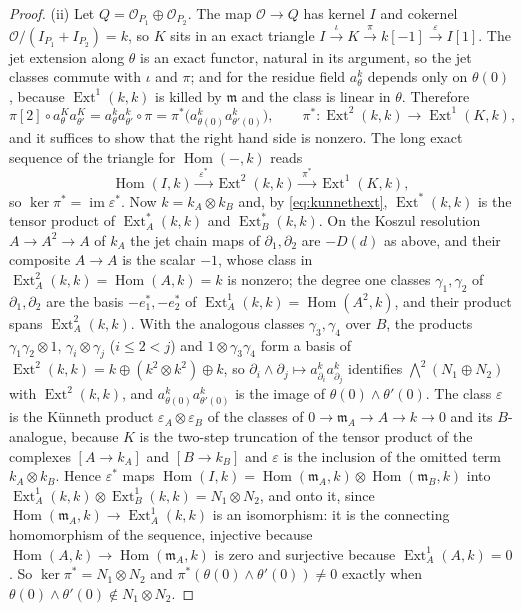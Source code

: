 \documentclass[11pt,reqno]{amsart}
\theoremstyle{plain}
\theoremstyle{definition}
\theoremstyle{remark}
\newcommand{\cO}{\mathcal{O}}
\DeclareMathOperator{\Hom}{Hom}
\DeclareMathOperator{\Ext}{Ext}
\DeclareMathOperator{\image}{im}
\begin{document}
\begin{proof}
(ii) Let $Q=\cO_{P_{1}}\oplus\cO_{P_{2}}$. The map $\cO\to Q$ has kernel $I$
and cokernel $\cO/(I_{P_{1}}+I_{P_{2}})=k$, so $K$ sits in an exact triangle
$I\xrightarrow{\iota}K\xrightarrow{\pi}k[-1]\xrightarrow{\varepsilon}I[1]$.
The jet extension along $\theta$ is an exact functor, natural in its
argument, so the jet classes commute with $\iota$ and $\pi$; and for the
residue field $a^{k}_{\theta}$ depends only on $\theta(0)$, because
$\Ext^{1}(k,k)$ is killed by $\mathfrak m$ and the class is linear in
$\theta$. Therefore
\[
  \pi[2]\circ a^{K}_{\theta}a^{K}_{\theta'}
  =a^{k}_{\theta}a^{k}_{\theta'}\circ\pi
  =\pi^{*}\bigl(a^{k}_{\theta(0)}a^{k}_{\theta'(0)}\bigr),
  \qquad\pi^{*}\colon\Ext^{2}(k,k)\to\Ext^{1}(K,k),
\]
and it suffices to show that the right hand side is nonzero. The long exact
sequence of the triangle for $\Hom(-,k)$ reads
\[
  \Hom(I,k)\xrightarrow{\;\varepsilon^{*}\;}\Ext^{2}(k,k)\xrightarrow{\;\pi^{*}\;}
  \Ext^{1}(K,k),
\]
so $\ker\pi^{*}=\image\varepsilon^{*}$. Now $k=k_{A}\otimes k_{B}$ and, by
\eqref{eq:kunnethext}, $\Ext^{*}(k,k)$ is the tensor product of
$\Ext^{*}_{A}(k,k)$ and $\Ext^{*}_{B}(k,k)$. On the Koszul resolution
$A\to A^{2}\to A$ of $k_{A}$ the jet chain maps of $\partial_{1},\partial_{2}$
are $-D(d)$ as above, and their composite $A\to A$ is the scalar $-1$, whose
class in $\Ext^{2}_{A}(k,k)=\Hom(A,k)=k$ is nonzero; the degree one classes
$\gamma_{1},\gamma_{2}$ of $\partial_{1},\partial_{2}$ are the basis
$-e_{1}^{*},-e_{2}^{*}$ of $\Ext^{1}_{A}(k,k)=\Hom(A^{2},k)$, and their
product spans $\Ext^{2}_{A}(k,k)$. With the analogous classes
$\gamma_{3},\gamma_{4}$ over $B$, the products $\gamma_{1}\gamma_{2}\otimes1$,
$\gamma_{i}\otimes\gamma_{j}$ ($i\le2<j$) and $1\otimes\gamma_{3}\gamma_{4}$
form a basis of $\Ext^{2}(k,k)=k\oplus(k^{2}\otimes k^{2})\oplus k$, so
$\partial_{i}\wedge\partial_{j}\mapsto a^{k}_{\partial_{i}}a^{k}_{\partial_{j}}$
identifies $\bigwedge^{2}(N_{1}\oplus N_{2})$ with $\Ext^{2}(k,k)$, and
$a^{k}_{\theta(0)}a^{k}_{\theta'(0)}$ is the image of $\theta(0)\wedge\theta'(0)$. The
class $\varepsilon$ is the K\"unneth product $\varepsilon_{A}\otimes\varepsilon_{B}$
of the classes of $0\to\mathfrak m_{A}\to A\to k\to0$ and its $B$-analogue,
because $K$ is the two-step truncation of the tensor product of the complexes
$[A\to k_{A}]$ and $[B\to k_{B}]$ and $\varepsilon$ is the inclusion of the
omitted term $k_{A}\otimes k_{B}$. Hence $\varepsilon^{*}$ maps
$\Hom(I,k)=\Hom(\mathfrak m_{A},k)\otimes\Hom(\mathfrak m_{B},k)$ into
$\Ext^{1}_{A}(k,k)\otimes\Ext^{1}_{B}(k,k)=N_{1}\otimes N_{2}$, and onto it,
since $\Hom(\mathfrak m_{A},k)\to\Ext^{1}_{A}(k,k)$ is an isomorphism: it is
the connecting homomorphism of the sequence, injective because
$\Hom(A,k)\to\Hom(\mathfrak m_{A},k)$ is zero and surjective because
$\Ext^{1}_{A}(A,k)=0$. So $\ker\pi^{*}=N_{1}\otimes N_{2}$
and $\pi^{*}(\theta(0)\wedge\theta'(0))\ne0$ exactly when
$\theta(0)\wedge\theta'(0)\notin N_{1}\otimes N_{2}$.
\end{proof}
\end{document}
